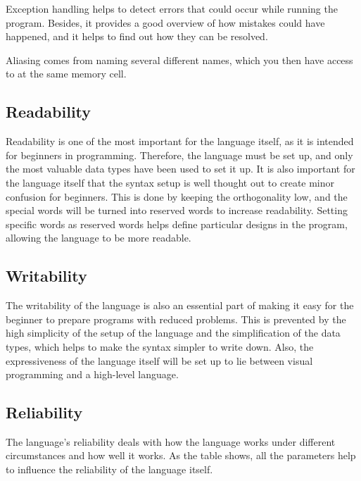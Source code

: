 Exception handling helps to detect errors that could occur while running the program. Besides, it provides a good overview of how mistakes could have happened, and it helps to find out how they can be resolved.

Aliasing comes from naming several different names, which you then have access to at the same memory cell.




\subsection{Readability}
Readability is one of the most important for the language itself, as it is intended for beginners in programming. 
Therefore, the language must be set up, and only the most valuable data types have been used to set it up. It is also important for the language itself that the syntax setup is well thought out to create minor confusion for beginners.
 This is done by keeping the orthogonality low, and the special words will be turned into reserved words to increase readability. 
Setting specific words as reserved words helps define particular designs in the program, allowing the language to be more readable.

\subsection{Writability}

The writability of the language is also an essential part of making it easy for the beginner to prepare programs with reduced problems. 
This is prevented by the high simplicity of the setup of the language and the simplification of the data types, which helps to make the syntax simpler to write down.
 Also, the expressiveness of the language itself will be set up to lie between visual programming and a high-level language.

 \subsection{Reliability}
 The language's reliability deals with how the language works under different circumstances and how well it works. 
 As the table shows, all the parameters help to influence the reliability of the language itself.

